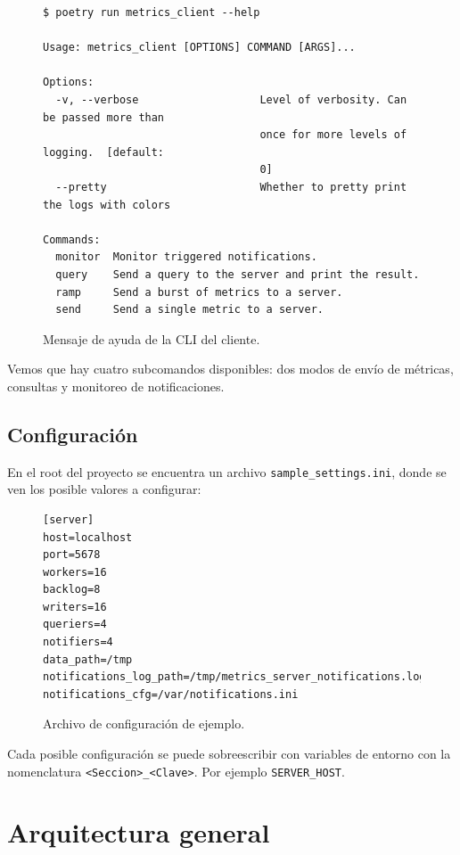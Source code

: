 \documentclass[a4paper,oneside]{article}
\begin{document}
\begin{figure}[H]
\begin{verbatim}
$ poetry run metrics_client --help

Usage: metrics_client [OPTIONS] COMMAND [ARGS]...

Options:
  -v, --verbose                   Level of verbosity. Can be passed more than
                                  once for more levels of logging.  [default:
                                  0]
  --pretty                        Whether to pretty print the logs with colors

Commands:
  monitor  Monitor triggered notifications.
  query    Send a query to the server and print the result.
  ramp     Send a burst of metrics to a server.
  send     Send a single metric to a server.
\end{verbatim}
\caption{Mensaje de ayuda de la CLI del cliente.}
\end{figure}

Vemos que hay cuatro subcomandos disponibles: dos modos de envío de métricas, consultas y monitoreo de notificaciones.

\subsection{Configuración} \label{configuracion}
En el root del proyecto se encuentra un archivo \texttt{sample\_settings.ini}, donde se ven los posible valores a configurar:

\begin{figure}[H]
\begin{verbatim}
[server]
host=localhost
port=5678
workers=16
backlog=8
writers=16
queriers=4
notifiers=4
data_path=/tmp
notifications_log_path=/tmp/metrics_server_notifications.log
notifications_cfg=/var/notifications.ini
\end{verbatim}
\caption{Archivo de configuración de ejemplo.}
\end{figure}

Cada posible configuración se puede sobreescribir con variables de entorno con la nomenclatura \texttt{<Seccion>\_<Clave>}. Por ejemplo \texttt{SERVER\_HOST}.

\section{Arquitectura general}
\end{document}
